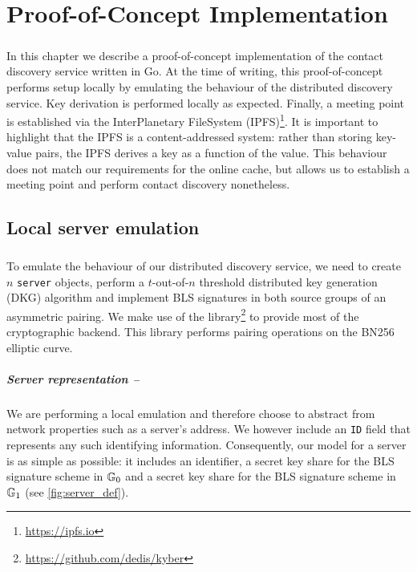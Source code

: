 \chapter{Proof-of-Concept Implementation}
\label{implementation}


\paragraph{} In this chapter we describe a proof-of-concept implementation of the contact discovery service written in Go. At the time of writing, this proof-of-concept performs setup locally by emulating the behaviour of the distributed discovery service. Key derivation is performed locally as expected. Finally, a meeting point is established via the InterPlanetary FileSystem (IPFS)\footnote{\url{https://ipfs.io}}. It is important to highlight that the IPFS is a content-addressed system: rather than storing key-value pairs, the IPFS derives a key as a function of the value. This behaviour does not match our requirements for the online cache, but allows us to establish a meeting point and perform contact discovery nonetheless.




\section{Local server emulation}

	\paragraph{} To emulate the behaviour of our distributed discovery service, we need to create $n$ \texttt{server} objects, perform a $t$-out-of-$n$ threshold distributed key generation (DKG) algorithm and implement BLS signatures in both source groups of an asymmetric pairing. We make use of the \kyber \;library\footnote{\url{https://github.com/dedis/kyber}} to provide most of the cryptographic backend. This library performs pairing operations on the BN256 elliptic curve.
	
	\paragraph{Server representation --} We are performing a local emulation and therefore choose to abstract from network properties such as a server's address. We however include an \texttt{ID} field that represents any such identifying information. Consequently, our model for a server is as simple as possible: it includes an identifier, a secret key share for the BLS signature scheme in $\mathbb{G}_0$ and a secret key share for the BLS signature scheme in $\mathbb{G}_1$ (see \autoref{fig:server_def}).
	

